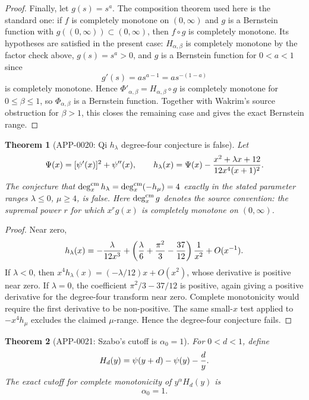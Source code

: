 \documentclass[11pt]{article}
\numberwithin{equation}{section}
\newtheorem{theorem}{Theorem}[section]
\theoremstyle{definition}
\theoremstyle{remark}
\newcommand{\1}{\mathbf 1}
\begin{document}
\begin{proof}
Finally, let \(g(s)=s^a\).  The composition theorem used here is the standard
one: if \(f\) is completely monotone on \((0,\infty)\) and \(g\) is a
Bernstein function with \(g((0,\infty))\subset(0,\infty)\), then \(f\circ g\)
is completely monotone.  Its hypotheses are satisfied in the present case:
\(H_{\alpha,\beta}\) is completely monotone by the factor check above,
\(g(s)=s^a>0\), and \(g\) is a Bernstein function for \(0<a<1\) since
\[
  g'(s)=a s^{a-1}=a s^{-(1-a)}
\]
is completely monotone.  Hence
\(\Phi'_{\alpha,\beta}=H_{\alpha,\beta}\circ g\) is completely monotone for
\(0\le\beta\le1\), so \(\Phi_{\alpha,\beta}\) is a Bernstein function.
Together with Wakrim's source obstruction for \(\beta>1\), this closes the
remaining case and gives the exact Bernstein range.
\end{proof}

\begin{theorem}[APP-0020: Qi \(h_\lambda\) degree-four conjecture is false]
\label{thm:app20-qi-hlambda}
Let
\[
  \Psi(x)=[\psi'(x)]^2+\psi''(x),\qquad
  h_\lambda(x)=\Psi(x)-
   {x^2+\lambda x+12\over 12x^4(x+1)^2}.
\]
The conjecture that
\(\deg_x^{\rm cm}h_\lambda=\deg_x^{\rm cm}(-h_\mu)=4\) exactly in the stated
parameter ranges \(\lambda\le0\), \(\mu\ge4\), is false.  Here
\(\deg_x^{\rm cm}g\) denotes the source convention: the supremal power \(r\)
for which \(x^rg(x)\) is completely monotone on \((0,\infty)\).
\end{theorem}

\begin{proof}
Near zero,
\[
 h_\lambda(x)=-{\lambda\over 12x^3}
 +\left({\lambda\over6}+{\pi^2\over3}-{37\over12}\right){1\over x^2}
 +O(x^{-1}).
\]
If \(\lambda<0\), then \(x^4h_\lambda(x)=(-\lambda/12)x+O(x^2)\), whose
derivative is positive near zero.  If \(\lambda=0\), the coefficient
\(\pi^2/3-37/12\) is positive, again giving a positive derivative for the
degree-four transform near zero.  Complete monotonicity would require the first
derivative to be non-positive.  The same small-\(x\) test applied to
\(-x^4h_\mu\) excludes the claimed \(\mu\)-range.  Hence the degree-four
conjecture fails.
\end{proof}

\begin{theorem}[APP-0021: Szabo's cutoff is \(\alpha_0=1\)]
\label{thm:app21-szabo-cutoff}
For \(0<d<1\), define
\[
  H_d(y)=\psi(y+d)-\psi(y)-{d\over y}.
\]
The exact cutoff for complete monotonicity of \(y^\alpha H_d(y)\) is
\[
  \alpha_0=1 .
\]
\end{theorem}
\end{document}
